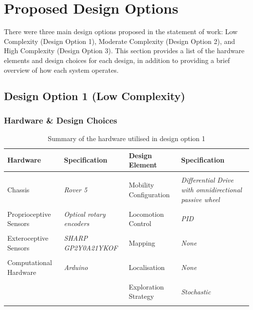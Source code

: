 \documentclass[a4paper]{article}
\begin{document}
\section{Proposed Design Options}
There were three main design options proposed in the statement of work: Low Complexity (Design Option 1), Moderate Complexity (Design Option 2), and High Complexity (Design Option 3). This section provides a list of the hardware elements and design choices for each design, in addition to providing a brief overview of how each system operates.
\subsection{Design Option 1 (Low Complexity)}
\subsubsection{Hardware \& Design Choices}
\begin{table}[h]
\centering
\caption{Summary of the hardware utilised in design option 1}\footnotesize
\begin{tabular}{p{3.5cm}p{3.8cm}p{3.5cm}p{3.8cm}}
\toprule
\textbf{Hardware} & \textbf{Specification} & \textbf{Design Element} & \textbf{Specification}\\
\midrule
& & &\\
Chassis  & \textit{Rover 5} & Mobility Configuration & \textit{Differential Drive with omnidirectional passive wheel}\\
& & &\\
Proprioceptive Sensors & \textit{Optical rotary encoders} & Locomotion Control & \textit{PID}\\
& & &\\
Exteroceptive Sensors & \textit{SHARP GP2Y0A21YKOF} & Mapping & \textit{None}\\
& & & \\
Computational Hardware & \textit{Arduino} & Localisation & \textit{None}\\
& & & \\
 & & Exploration Strategy & \textit{Stochastic}\\
& & & \\
\bottomrule
\end{tabular}
\end{table}
\end{document}
